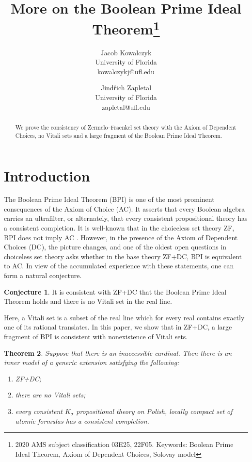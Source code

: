 \documentclass{article}
\title{More on the Boolean Prime Ideal Theorem\footnote{2020 AMS subject classification 03E25, 22F05. Keywords: Boolean Prime Ideal Theorem, Axiom of Dependent Choices, Solovay model}}
\author{
	Jacob Kowalczyk\\
	University of Florida\\
	kowalczykj@ufl.edu
	\and
	Jind{\v r}ich Zapletal\\
	University of Florida\\
	zapletal@ufl.edu}
\newcommand{\gs}{\sigma}
\newtheorem{theorem}{Theorem}[section]
\theoremstyle{definition}
\newtheorem{conjecture}[theorem]{Conjecture}
\begin{document}
	\maketitle
	
	\begin{abstract}
		We prove the consistency of  Zermelo--Fraenkel set theory with the Axiom of Dependent Choices, no Vitali sets and a large fragment of the Boolean Prime Ideal Theorem.
	\end{abstract}
	
	\section{Introduction}

The Boolean Prime Ideal Theorem (BPI) is one of the most prominent consequences of the Axiom of Choice (AC). It asserts that every Boolean algebra carries an ultrafilter, or alternately, that every consistent propositional theory has a consistent completion. It is well-known that in the choiceless set theory ZF, BPI does not imply AC \cite{halpern:lauchli}. However, in the presence of the Axiom of Dependent Choices (DC), the picture changes, and one of the oldest open questions in choiceless set theory \cite{pincus:original} asks whether in the base theory ZF+DC, BPI is equivalent to AC. In view of the accumulated experience with these statements, one can form a natural conjecture.

\begin{conjecture}
\label{mainconjecture}
It is consistent with ZF+DC that the Boolean Prime Ideal Theorem holds and there is no Vitali set in the real line.
\end{conjecture}

\noindent Here, a Vitali set is a subset of the real line which for every real contains exactly one of its rational translates. In this paper, we show that in ZF+DC, a large fragment of BPI is consistent with nonexistence of Vitali sets. 

\begin{theorem}
\label{maintheorem}
Suppose that there is an inaccessible cardinal. Then there is an inner model of a generic extension satisfying the following:

\begin{enumerate}
\item ZF+DC;
\item there are no Vitali sets;
 \item every consistent $K_\gs$ propositional theory on Polish, locally compact set of atomic formulas has a consistent completion.
\end{enumerate}
\end{theorem}
\end{document}
